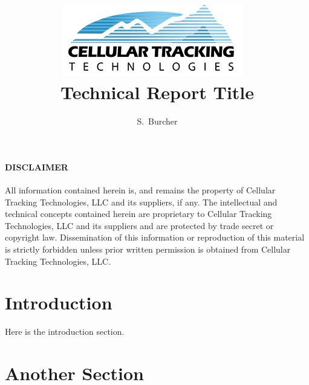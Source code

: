 \documentclass[12pt]{article}
\title{
\vspace{2cm}
\includegraphics[scale=0.70]{Figures/ctt_logo_300.png}~
\\[1cm]
\textbf{Technical Report Title}
}
\author[1]{S.~Burcher}
\affil[1]{Cellular Tracking Technologies, Rio Grande, NJ 08242}
\begin{document}

\maketitle
\thispagestyle{fancyfront}
\vspace*{0.1cm}
\centering



\newpage
\thispagestyle{fancyfront}
\vspace*{2cm}
\centering
\paragraph*{DISCLAIMER}
\begin{center}
\justify
All information contained herein is, and remains the property of Cellular Tracking Technologies, LLC and its suppliers, if any.  The intellectual and technical concepts contained herein are proprietary to Cellular Tracking Technologies, LLC and its suppliers and are protected by trade secret or copyright law. Dissemination of this information or reproduction of this material is strictly forbidden unless prior written permission is obtained from Cellular Tracking Technologies, LLC.

\end{center}


\newpage
\raggedright
\justify
\thispagestyle{fancyfront}

\tableofcontents


\newpage
\pagestyle{fancymain}

\section{Introduction}

Here is the introduction section.



\section{Another Section}
\end{document}
